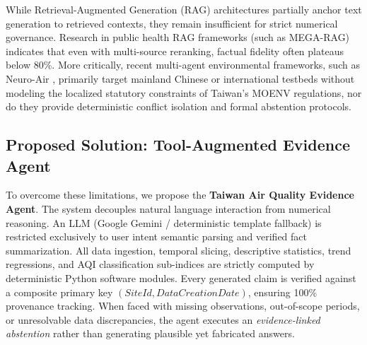\documentclass[conference]{IEEEtran}
\begin{document}
While Retrieval-Augmented Generation (RAG) architectures partially anchor text generation to retrieved contexts, they remain insufficient for strict numerical governance. Research in public health RAG frameworks (such as MEGA-RAG) indicates that even with multi-source reranking, factual fidelity often plateaus below 80\%. More critically, recent multi-agent environmental frameworks, such as Neuro-Air \cite{ma2026multi}, primarily target mainland Chinese or international testbeds without modeling the localized statutory constraints of Taiwan's MOENV regulations, nor do they provide deterministic conflict isolation and formal abstention protocols.

\subsection{Proposed Solution: Tool-Augmented Evidence Agent}
To overcome these limitations, we propose the \textbf{Taiwan Air Quality Evidence Agent}. The system decouples natural language interaction from numerical reasoning. An LLM (Google Gemini / deterministic template fallback) is restricted exclusively to user intent semantic parsing and verified fact summarization. All data ingestion, temporal slicing, descriptive statistics, trend regressions, and AQI classification sub-indices are strictly computed by deterministic Python software modules. Every generated claim is verified against a composite primary key $(SiteId, DataCreationDate)$, ensuring 100\% provenance tracking. When faced with missing observations, out-of-scope periods, or unresolvable data discrepancies, the agent executes an \textit{evidence-linked abstention} rather than generating plausible yet fabricated answers.
\end{document}
